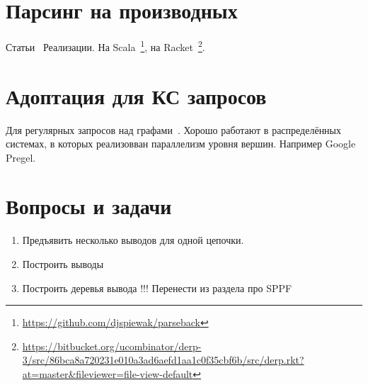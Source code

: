 \section{Парсинг на производных}

Статьи~\cite{DBLP:journals/corr/abs-1010-5023,Adams:2016:CPP:2908080.2908128,Might:2011:PDF:2034574.2034801,andersenparsing}
Реализации.
На Scala~\footnote{\url{https://github.com/djspiewak/parseback}}, на Racket~\footnote{\url{https://bitbucket.org/ucombinator/derp-3/src/86bca8a720231e010a3ad6aefd1aa1c0f35cbf6b/src/derp.rkt?at=master&fileviewer=file-view-default}}.

\section{Адоптация для КС запросов}

Для регулярных запросов над графами~\cite{Nole:2016:RPQ:2949689.2949711}.
Хорошо работают в распределённых системах, в которых реализовван параллелизм уровня вершин. 
Например Google Pregel.



\section{Вопросы и задачи}
\begin{enumerate}
  \item Предъявить несколько выводов для одной цепочки.
  \item Построить выводы
  \item Построить деревья вывода !!! Перенести из раздела про SPPF
\end{enumerate}

